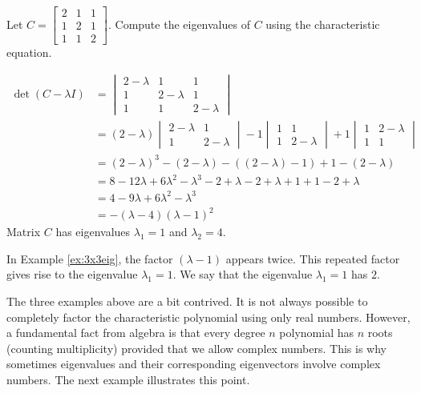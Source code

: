 \documentclass{ximera}
\begin{document}
\begin{example}\label{ex:3x3eig}
Let $C=\begin{bmatrix} 2 & 1 & 1\\ 1 & 2 & 1\\ 1 & 1 & 2\end{bmatrix}$.  Compute the eigenvalues of $C$ using the characteristic equation.
\begin{explanation}
\begin{align*}\det(C-\lambda I)&=\begin{vmatrix}2-\lambda & 1 & 1\\ 1 & 2-\lambda & 1\\ 1 & 1 & 2-\lambda\end{vmatrix}\\
&=(2-\lambda)\begin{vmatrix}2-\lambda&1\\1&2-\lambda\end{vmatrix}-1\begin{vmatrix}1&1\\1&2-\lambda\end{vmatrix}+1\begin{vmatrix}1&2-\lambda\\1&1\end{vmatrix}\\
&=(2-\lambda)^3-(2-\lambda)-((2-\lambda)-1)+1-(2-\lambda)\\
&=8-12\lambda+6\lambda^2-\lambda^3-2+\lambda-2+\lambda+1+1-2+\lambda\\
&=4-9\lambda+6\lambda^2-\lambda^3\\
&=-(\lambda-4)(\lambda-1)^2
\end{align*}
Matrix $C$ has eigenvalues $\lambda_1=1$ and $\lambda_2=4$.
\end{explanation}
\end{example}

In Example \ref{ex:3x3eig}, the factor  $(\lambda-1)$ appears twice.  This repeated factor gives rise to the eigenvalue $\lambda_1=1$.  We say that the eigenvalue $\lambda_1=1$ has  $2$. 

The three examples above are a bit contrived.  It is not always possible to completely factor the characteristic polynomial using only real numbers.  However, a fundamental fact from algebra is that every degree $n$ polynomial has $n$ roots (counting multiplicity) provided that we allow complex numbers.  This is why sometimes eigenvalues and their corresponding eigenvectors involve complex numbers.  The next example illustrates this point.
\end{document}
